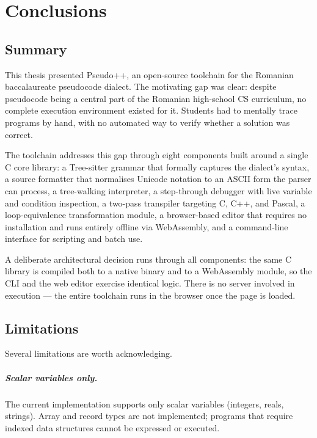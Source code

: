 \chapter{Conclusions}
\label{chap:conclusions}

\section{Summary}
\label{sec:summary}

This thesis presented Pseudo++, an open-source toolchain for the Romanian
baccalaureate pseudocode dialect.  The motivating gap was clear: despite
pseudocode being a central part of the Romanian high-school CS curriculum,
no complete execution environment existed for it.  Students had to
mentally trace programs by hand, with no automated way to verify whether
a solution was correct.

The toolchain addresses this gap through eight components built around a
single C core library: a Tree-sitter grammar that formally captures the
dialect's syntax, a source formatter that normalises Unicode notation to
an ASCII form the parser can process, a tree-walking interpreter, a
step-through debugger with live variable and condition inspection, a
two-pass transpiler targeting C, C++, and Pascal, a loop-equivalence
transformation module, a browser-based editor that requires no
installation and runs entirely offline via WebAssembly, and a
command-line interface for scripting and batch use.

A deliberate architectural decision runs through all components: the
same C library is compiled both to a native binary and to a WebAssembly
module, so the CLI and the web editor exercise identical logic.  There is
no server involved in execution --- the entire toolchain runs in the
browser once the page is loaded.

\section{Limitations}
\label{sec:limitations}

Several limitations are worth acknowledging.

\paragraph{Scalar variables only.}
The current implementation supports only scalar variables (integers, reals,
strings).  Array and record types are not implemented; programs that require
indexed data structures cannot be expressed or executed.

